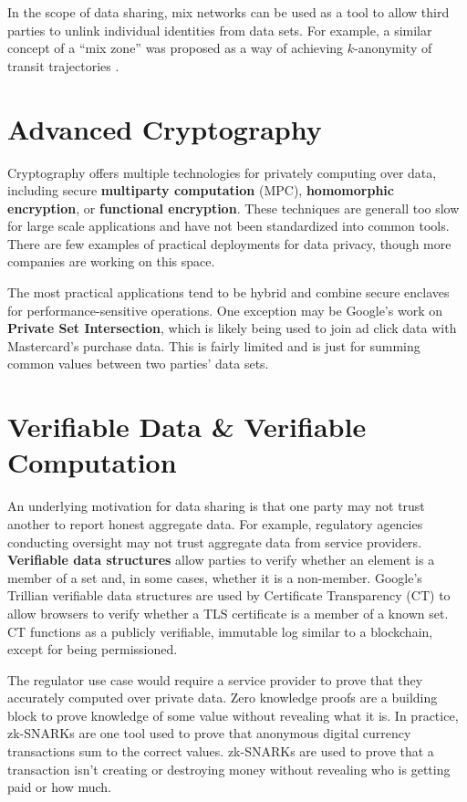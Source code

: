 \documentclass[nobib]{tufte-handout}
\begin{document}
In the scope of data sharing, mix networks can be used as a tool to allow third
parties to unlink individual identities from data sets. For example, a similar
concept of a “mix zone” was proposed as a way
 of achieving $k$-anonymity of
transit trajectories \cite{freudiger2007mix}.

\section{Advanced Cryptography}

Cryptography offers multiple technologies for privately computing over data,
including secure \textbf{multiparty computation} (MPC), \textbf{homomorphic
encryption}, or \textbf{functional encryption}. These techniques are generall
too slow for large scale applications and have not been standardized into common
tools. There are few examples of practical deployments for data privacy, though
more companies are working on this space.

The most practical applications tend to be hybrid and combine secure enclaves
for performance-sensitive operations. One exception may be Google’s work on
\textbf{Private Set Intersection}, which is likely being used to join ad click
data with Mastercard’s purchase data. This is fairly limited and is just for
summing common values between two parties’ data sets.

\section{Verifiable Data \& Verifiable Computation}

An underlying motivation for data sharing is that one party may not trust
another to report honest aggregate data. For example, regulatory agencies
conducting oversight may not trust aggregate data from service providers.
\textbf{Verifiable data structures} allow parties to verify whether an element
is a member of a set and, in some cases, whether it is a non-member. Google’s
Trillian verifiable data structures are used by Certificate Transparency (CT) to
allow browsers to verify whether a TLS certificate is a member of a known set.
CT functions as a publicly verifiable, immutable log similar to a blockchain,
except for being permissioned.

The regulator use case would require a service provider to prove that they
accurately computed over private data. Zero knowledge proofs are a building
block to prove knowledge of some value without revealing what it is. In
practice, zk-SNARKs are one tool used to prove that anonymous digital currency
transactions sum to the correct values. zk-SNARKs are used to prove that a
transaction isn’t creating or destroying money without revealing who is getting
paid or how much.
\end{document}
